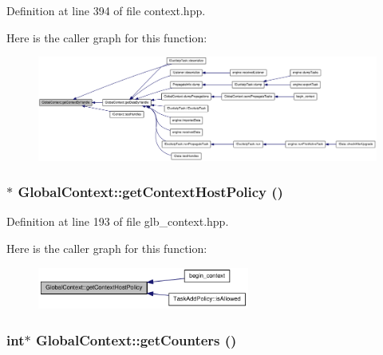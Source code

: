 Definition at line 394 of file context.hpp.

Here is the caller graph for this function:\nopagebreak
\begin{figure}[H]
\begin{center}
\leavevmode
\includegraphics[width=420pt]{class_global_context_abed42c65852eb40358a222c34108c65a_icgraph}
\end{center}
\end{figure}
\hypertarget{class_global_context_adee851ed3b5bc641f500fca07ba72498}{
\subsubsection[{getContextHostPolicy}]{$\ast$ GlobalContext::getContextHostPolicy ()}}
\label{class_global_context_adee851ed3b5bc641f500fca07ba72498}


Definition at line 193 of file glb\_\-context.hpp.

Here is the caller graph for this function:\nopagebreak
\begin{figure}[H]
\begin{center}
\leavevmode
\includegraphics[width=197pt]{class_global_context_adee851ed3b5bc641f500fca07ba72498_icgraph}
\end{center}
\end{figure}
\hypertarget{class_global_context_a6bf21d326b4dec65505b1296170498ed}{
\subsubsection[{getCounters}]{\setlength{\rightskip}{0pt plus 5cm}int$\ast$ GlobalContext::getCounters ()}}
\label{class_global_context_a6bf21d326b4dec65505b1296170498ed}


